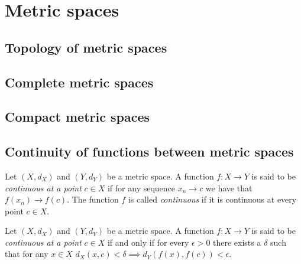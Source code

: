 \section{Metric spaces}

\subsection{Topology of metric spaces}

\subsection{Complete metric spaces}

\subsection{Compact metric spaces}

\subsection{Continuity of functions between metric spaces}
\begin{defn}
\label{def:continousFunction}Let $\left(X,d_{X}\right)$ and $\left(Y,d_{Y}\right)$
be a metric space. A function $f:X\to Y$ is said to be \emph{continuous
at a point} $c\in X$ if for any sequence $x_{n}\to c$ we have that
$f\left(x_{n}\right)\to f\left(c\right)$. The function $f$ is called
\emph{continuous }if it is continuous at every point $c\in X$.
\end{defn}

\begin{prop}
\label{prop:equivalentContinuity}Let $\left(X,d_{X}\right)$ and
$\left(Y,d_{Y}\right)$ be a metric space. A function $f:X\to Y$
is said to be \emph{continuous at a point} $c\in X$ if and only if
for every $\epsilon>0$ there exists a $\delta$ such that for any
$x\in X$ $d_{X}\left(x,c\right)<\delta\implies d_{Y}\left(f\left(x\right),f\left(c\right)\right)<\epsilon$.
\end{prop}

